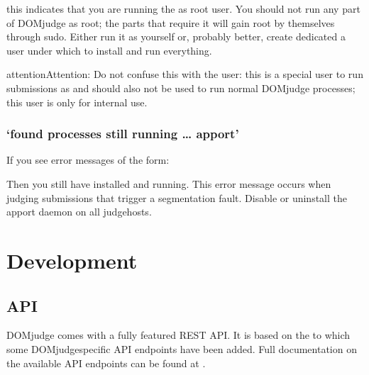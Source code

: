 \documentclass[a4paper,10pt,english,openany]{sphinxmanual}
\begin{document}
\sphinxAtStartPar
this indicates that you are running the  as root user. You should
not run any part of DOMjudge as root; the parts that require it will gain root
by themselves through sudo. Either run it as yourself or, probably better,
create dedicated a user  under which to install and run everything.

\begin{sphinxadmonition}{attention}{Attention:}
\sphinxAtStartPar
Do not confuse this with the  user:
this is a special user to run submissions as and should also not
be used to run normal DOMjudge processes; this user is only for
internal use.
\end{sphinxadmonition}


\subsubsection{‘found processes still running … apport’}
\label{\detokenize{judging:found-processes-still-running-apport}}
\sphinxAtStartPar
If you see error messages of the form:

\begin{sphinxVerbatim}[commandchars=\\\{\}]
        
 
\end{sphinxVerbatim}

\sphinxAtStartPar
Then you still have  installed and running. This error message occurs when
judging submissions that trigger a segmentation fault. Disable or uninstall the apport
daemon on all judgehosts.

\sphinxstepscope


\section{Development}
\label{\detokenize{develop:development}}\label{\detokenize{develop::doc}}

\subsection{API}
\label{\detokenize{develop:api}}\label{\detokenize{develop:id1}}
\sphinxAtStartPar
DOMjudge comes with a fully featured REST API. It is based on the
to which some DOMjudge\sphinxhyphen{}specific API endpoints have been added. Full documentation
on the available API endpoints can be found at
.
\end{document}
